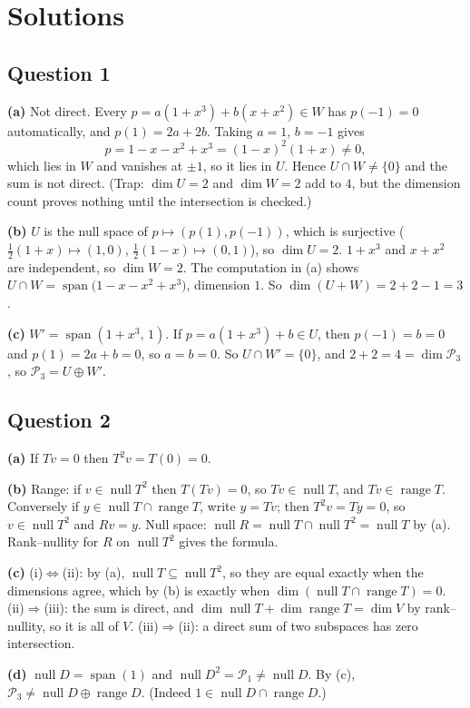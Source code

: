 \documentclass[11pt]{scrartcl}
\DeclareMathOperator{\nul}{null}
\DeclareMathOperator{\range}{range}
\DeclareMathOperator{\spn}{span}
\newcommand{\PP}{\mathcal P}
\begin{document}
\newpage
\section*{Solutions}

\subsection*{Question 1}
\textbf{(a)} Not direct. Every $p=a(1+x^3)+b(x+x^2)\in W$ has $p(-1)=0$ automatically, and $p(1)=2a+2b$. Taking $a=1$, $b=-1$ gives
\[ p=1-x-x^2+x^3=(1-x)^2(1+x)\ne0, \]
which lies in $W$ and vanishes at $\pm1$, so it lies in $U$. Hence $U\cap W\ne\{0\}$ and the sum is not direct.
(Trap: $\dim U=2$ and $\dim W=2$ add to $4$, but the dimension count proves nothing until the intersection is checked.)

\textbf{(b)} $U$ is the null space of $p\mapsto(p(1),p(-1))$, which is surjective ($\tfrac12(1+x)\mapsto(1,0)$, $\tfrac12(1-x)\mapsto(0,1)$), so $\dim U=2$. $1+x^3$ and $x+x^2$ are independent, so $\dim W=2$. The computation in (a) shows $U\cap W=\spn\big(1-x-x^2+x^3\big)$, dimension $1$. So $\dim(U+W)=2+2-1=3$.

\textbf{(c)} $W'=\spn(1+x^3,\,1)$. If $p=a(1+x^3)+b\in U$, then $p(-1)=b=0$ and $p(1)=2a+b=0$, so $a=b=0$. So $U\cap W'=\{0\}$, and $2+2=4=\dim\PP_3$, so $\PP_3=U\oplus W'$.

\subsection*{Question 2}
\textbf{(a)} If $Tv=0$ then $T^2v=T(0)=0$.

\textbf{(b)} Range: if $v\in\nul T^2$ then $T(Tv)=0$, so $Tv\in\nul T$, and $Tv\in\range T$. Conversely if $y\in\nul T\cap\range T$, write $y=Tv$; then $T^2v=Ty=0$, so $v\in\nul T^2$ and $Rv=y$.
Null space: $\nul R=\nul T\cap\nul T^2=\nul T$ by (a).
Rank--nullity for $R$ on $\nul T^2$ gives the formula.

\textbf{(c)} (i)$\Leftrightarrow$(ii): by (a), $\nul T\subseteq\nul T^2$, so they are equal exactly when the dimensions agree, which by (b) is exactly when $\dim(\nul T\cap\range T)=0$.
(ii)$\Rightarrow$(iii): the sum is direct, and $\dim\nul T+\dim\range T=\dim V$ by rank--nullity, so it is all of $V$.
(iii)$\Rightarrow$(ii): a direct sum of two subspaces has zero intersection.

\textbf{(d)} $\nul D=\spn(1)$ and $\nul D^2=\PP_1\ne\nul D$. By (c), $\PP_3\ne\nul D\oplus\range D$. (Indeed $1\in\nul D\cap\range D$.)
\end{document}
